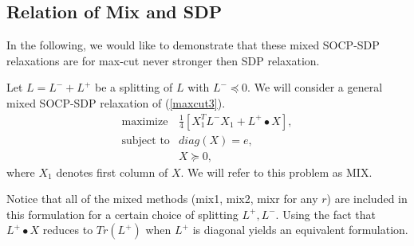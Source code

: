 \documentclass[12pt]{book}
\theoremstyle{definition}
\begin{document}



\subsection{Relation of Mix and SDP}

In the following, we would like to demonstrate that these mixed SOCP-SDP relaxations are for max-cut never stronger then SDP relaxation. 

Let $L = L^- + L^+$ be a splitting of $L$ with $L^-\preceq 0.$
We will consider a general mixed SOCP-SDP relaxation of (\ref{maxcut3}).
\begin{equation}
\label{MaxCutMixedRelaxGeneral}
\begin{array}{ll}
\mbox{maximize} & \frac{1}{4}\left[ X_1^TL^-X_1 + L^+\bullet X \right], \\
\mbox{subject to} &  diag(X) = e, \\
			& X\succeq 0,
\end{array}
\end{equation}
where $X_1$ denotes first column of $X$. We will refer to this problem as MIX.

\rem Notice that all of the mixed methods (mix1, mix2, mixr for any $r$) are included in this formulation for a certain choice of splitting $L^+, L^-$. Using the fact that $L^+\bullet X$ reduces to $Tr(L^+)$ when $L^+$ is diagonal yields an equivalent formulation.
\end{document}
